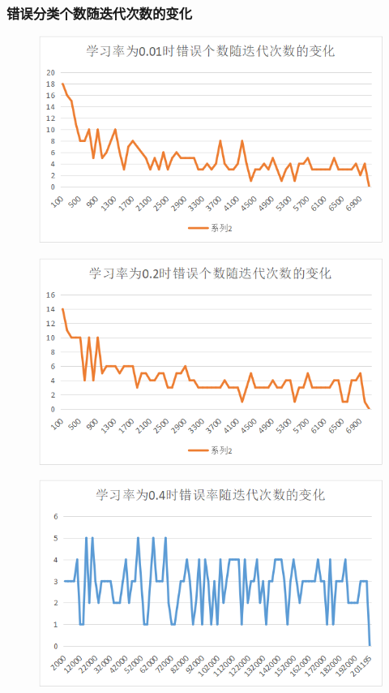 \documentclass[10pt,a4paper]{ctexart}
\begin{document}
  \subsubsection*{错误分类个数随迭代次数的变化}
  
  \begin{figure}[htbp]
  \centering
  \includegraphics[width=1\textwidth]{1.01.png}
  \end{figure}
    \begin{figure}[htbp]
  \centering
  \includegraphics[width=1\textwidth]{1.02.png}
    \end{figure}
    \begin{figure}[htbp]
  \centering
  \includegraphics[width=1\textwidth]{1.04.png}
    \end{figure}
\end{document}

